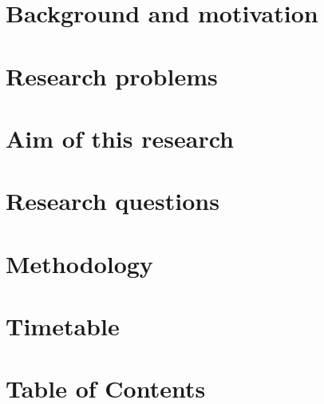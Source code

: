 












\tableofcontents
\newpage

\chapter{Background and motivation}


\chapter{Research problems}


{\let\clearpage\relax\chapter{Aim of this research}}


\chapter{Research questions}


\chapter{Methodology}


\chapter{Timetable}


\chapter{Table of Contents}





